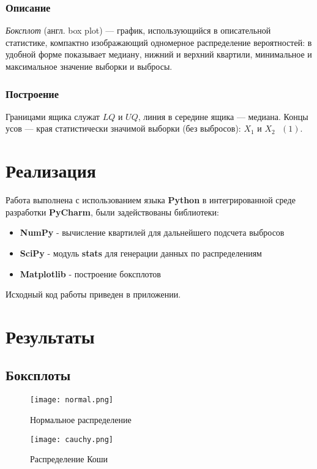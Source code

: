 \documentclass[12pt,a4paper]{article}
\begin{document}
\subsubsection{Описание}
\textit{Боксплот} (англ. box plot) — график, использующийся в описательной статистике, компактно изображающий одномерное распределение вероятностей: в удобной форме показывает медиану, нижний и верхний квартили, минимальное и максимальное значение выборки и выбросы.\cite{boxplot}

\subsubsection{Построение}
Границами ящика служат $LQ \text{ и } UQ$, линия в середине ящика — медиана. Концы усов — края статистически значимой выборки (без выбросов): $X_1 \text{ и } X_2 \text{ }\hyperref[1]{(1)}$.

\pagebreak

\section{Реализация}
\label{sec:impl}
Работа выполнена с использованием языка \textbf{Python} в интегрированной среде разработки \textbf{PyCharm}, были задействованы библиотеки:

\begin{itemize}
	\item \textbf{NumPy} - вычисление квартилей для дальнейшего подсчета выбросов
	\item \textbf{SciPy} - модуль \textbf{stats} для генерации данных по распределениям
	\item \textbf{Matplotlib} - построение боксплотов
\end{itemize}

Исходный код работы приведен в приложении. 
\pagebreak

\section{Результаты}
\subsection{Боксплоты}
\begin{figure}[h!]
	\centering
	\texttt{[image: normal.png]}
	\caption{Нормальное распределение}
	\label{fig:image}
\end{figure}

\begin{figure}[h!]\label{4}
	\centering
	\texttt{[image: cauchy.png]}
	\caption{Распределение Коши}
	\label{fig:image:cauchy}
\end{figure}
\end{document}
